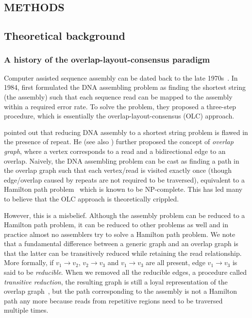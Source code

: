 \documentclass{bioinfo}
\begin{document}
\begin{methods}
\section{METHODS}
\subsection{Theoretical background}
\subsubsection{A history of the overlap-layout-consensus paradigm}
Computer assisted sequence assembly can be dated back to the late
1970s~\citep{Staden:1979dq,Gingeras:1979cr}. 
In 1984, \citeauthor{Peltola:1984qf} first formulated the DNA assembling
problem as finding the shortest string (the assembly) such that each sequence
read can be mapped to the assembly within a required error rate.
To solve the problem, they proposed a three-step procedure, which is
essentially the overlap-layout-consensus (OLC) approach.

\citet{Myers:1995nx} pointed out that reducing DNA assembly to a shortest
string problem is flawed in the presence of repeat. He (see also
\citealt{DBLP:journals/algorithmica/KececiogluM95}) further proposed the
concept of \emph{overlap graph}, where a vertex corresponds to a read and a
bidirectional edge to an overlap. Naively, the DNA assembling
problem can be cast as finding a path in the overlap graph such that
each vertex/read is visited exactly once (though edge/overlap caused by
repeats are not required to be traversed), equivalent to a Hamilton path
problem~\citep{Compeau:2011fk,Li:2011zr} which is known to be NP-complete. This has led many to believe that the
OLC approach is theoretically crippled.

However, this is a misbelief. Although the assembly problem can be reduced
to a Hamilton path problem, it can be reduced to other problems as well and
in practice almost no assemblers try to solve a Hamilton path problem.
We note that a fundamental difference between a generic
graph and an overlap graph is that the latter can be transitively
reduced while retaining the read relationship. More formally,
if $v_1\to v_2$, $v_2\to v_3$ and $v_1\to v_3$ are all present,
edge $v_1\to v_3$ is said to be \emph{reducible}. When we removed all the
reducible edges, a procedure called \emph{transitive reduction}, the resulting graph
is still a loyal representation of the overlap graph~\citep{Myers:1995nx}, but
the path corresponding to the assembly is not a Hamilton path any more because
reads from repetitive regions need to be traversed multiple times.


\end{methods}
\end{document}
